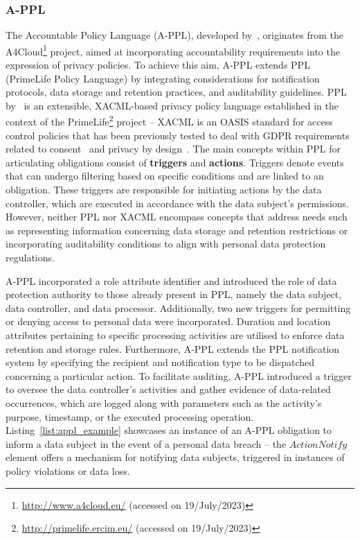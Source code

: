 \subsubsection{A-PPL}
\label{sec:appl}

The Accountable Policy Language (A-PPL), developed by~\cite{azraoui_appl_2014}, originates from the A4Cloud\footnote{\url{http://www.a4cloud.eu/} (accessed on 19/July/2023)} project, aimed at incorporating accountability requirements into the expression of privacy policies.
To achieve this aim, A-PPL extends PPL (PrimeLife Policy Language) by integrating considerations for notification protocols, data storage and retention practices, and auditability guidelines.
PPL by~\cite{ardagna_primelife_2009} is an extensible, XACML-based \citeyearpar{parducci_extensible_2013} privacy policy language established in the context of the PrimeLife\footnote{\url{http://primelife.ercim.eu/} (accessed on 19/July/2023)} project -- XACML is an OASIS standard for access control policies that has been previously tested to deal with GDPR requirements related to consent~\citep{fatema_compliance_2017} and privacy by design~\citep{piras_defend_2019}.
The main concepts within PPL for articulating obligations consist of \textbf{triggers} and \textbf{actions}.
Triggers denote events that can undergo filtering based on specific conditions and are linked to an obligation.
These triggers are responsible for initiating actions by the data controller, which are executed in accordance with the data subject's permissions.
However, neither PPL nor XACML encompass concepts that address needs such as representing information concerning data storage and retention restrictions or incorporating auditability conditions to align with personal data protection regulations.

A-PPL incorporated a role attribute identifier and introduced the role of data protection authority to those already present in PPL, namely the data subject, data controller, and data processor.
Additionally, two new triggers for permitting or denying access to personal data were incorporated.
Duration and location attributes pertaining to specific processing activities are utilised to enforce data retention and storage rules.
Furthermore, A-PPL extends the PPL notification system by specifying the recipient and notification type to be dispatched concerning a particular action.
To facilitate auditing, A-PPL introduced a trigger to oversee the data controller's activities and gather evidence of data-related occurrences, which are logged along with parameters such as the activity's purpose, timestamp, or the executed processing operation.
Listing~\ref{list:appl_example} showcases an instance of an A-PPL obligation to inform a data subject in the event of a personal data breach -- the $ActionNotify$ element offers a mechanism for notifying data subjects, triggered in instances of policy violations or data loss.

